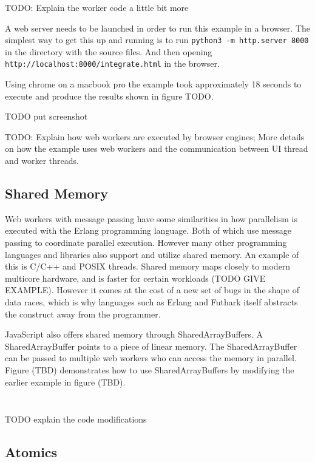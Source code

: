 \documentclass[11pt]{article}
\begin{document}
TODO: Explain the worker code a little bit more


A web server needs to be launched in order to run this example in a browser. The simplest way to get this up and running is to run \texttt{python3 -m http.server 8000} in the directory with the source files.  And then opening \texttt{http://localhost:8000/integrate.html} in the browser.

Using chrome on a macbook pro the example took approximately 18 seconds to execute and produce the results shown in figure TODO.

TODO put screenshot

TODO: Explain how web workers are executed by browser engines; More details on how the example uses web workers and the communication between UI thread and worker threads.


\subsection{Shared Memory}

Web workers with message passing have some similarities in how parallelism is executed with the Erlang programming language. Both of which use message passing to coordinate parallel execution. However many other programming languages and libraries also support and utilize shared memory. An example of this is C/C++ and POSIX threads. Shared memory maps closely to modern multicore hardware, and is faster for certain workloads (TODO GIVE EXAMPLE). However it comes at the cost of a new set of bugs in the shape of data races, which is why languages such as Erlang and Futhark itself abstracts the construct away from the programmer.


JavaScript also offers shared memory through SharedArrayBuffers. A SharedArrayBuffer points to a piece of linear memory. The SharedArrayBuffer can be passed to multiple web workers who can access the memory in parallel. Figure (TBD) demonstrates how to use SharedArrayBuffers by modifying the earlier example in figure (TBD).


\inputminted[fontsize=\small,baselinestretch=0.5,linenos]{html}{code/shared/integrate.html}

\inputminted[fontsize=\small,baselinestretch=0.5,linenos]{javascript}{code/shared/worker.js}

TODO explain the code modifications


\subsection{Atomics}
\end{document}
